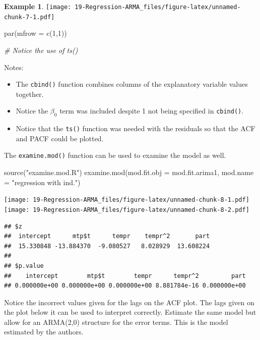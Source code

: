 \documentclass[
]{book}
\newenvironment{Shaded}{\begin{snugshade}}{\end{snugshade}}
\newcommand{\AttributeTok}[1]{\textcolor[rgb]{0.77,0.63,0.00}{#1}}
\newcommand{\CommentTok}[1]{\textcolor[rgb]{0.56,0.35,0.01}{\textit{#1}}}
\newcommand{\DecValTok}[1]{\textcolor[rgb]{0.00,0.00,0.81}{#1}}
\newcommand{\FunctionTok}[1]{\textcolor[rgb]{0.00,0.00,0.00}{#1}}
\newcommand{\NormalTok}[1]{#1}
\newcommand{\OtherTok}[1]{\textcolor[rgb]{0.56,0.35,0.01}{#1}}
\newcommand{\StringTok}[1]{\textcolor[rgb]{0.31,0.60,0.02}{#1}}
\providecommand{\tightlist}{%
  \setlength{\itemsep}{0pt}\setlength{\parskip}{0pt}}
\theoremstyle{definition}
\theoremstyle{definition}
\newtheorem{example}{Example}[chapter]
\theoremstyle{definition}
\theoremstyle{definition}
\theoremstyle{remark}
\begin{document}
\begin{example}
\texttt{[image: 19-Regression-ARMA\_files/figure-latex/unnamed-chunk-7-1.pdf]}

\begin{Shaded}
\begin{Highlighting}[]
\FunctionTok{par}\NormalTok{(}\AttributeTok{mfrow =} \FunctionTok{c}\NormalTok{(}\DecValTok{1}\NormalTok{,}\DecValTok{1}\NormalTok{))}

\CommentTok{\# Notice the use of ts()}
\end{Highlighting}
\end{Shaded}

Notes:

\begin{itemize}
\tightlist
\item
  The \texttt{cbind()} function combines columns of the explanatory variable values together.
\item
  Notice the \(\beta_0\) term was included despite 1 not being specified in \texttt{cbind()}.
\item
  Notice that the \texttt{ts()} function was needed with the residuals so that the ACF and PACF could be plotted.
\end{itemize}

The \texttt{examine.mod()} function can be used to examine the model as well.

\begin{Shaded}
\begin{Highlighting}[]
\FunctionTok{source}\NormalTok{(}\StringTok{"examine.mod.R"}\NormalTok{)}
\FunctionTok{examine.mod}\NormalTok{(}\AttributeTok{mod.fit.obj =}\NormalTok{ mod.fit.arima1, mod.name}
    \OtherTok{=} \StringTok{"regression with ind."}\NormalTok{)}
\end{Highlighting}
\end{Shaded}

\texttt{[image: 19-Regression-ARMA\_files/figure-latex/unnamed-chunk-8-1.pdf]} \texttt{[image: 19-Regression-ARMA\_files/figure-latex/unnamed-chunk-8-2.pdf]}

\begin{verbatim}
## $z
##  intercept      mtp$t      tempr    tempr^2       part 
##  15.330848 -13.884370  -9.080527   8.028929  13.608224 
## 
## $p.value
##    intercept        mtp$t        tempr      tempr^2         part 
## 0.000000e+00 0.000000e+00 0.000000e+00 8.881784e-16 0.000000e+00
\end{verbatim}

Notice the incorrect values given for the lags on the ACF plot. The lags given on the plot below it can be used to interpret correctly.
Estimate the same model but allow for an ARMA(2,0) structure for the error terms. This is the model estimated by the authors.


\end{example}
\end{document}
